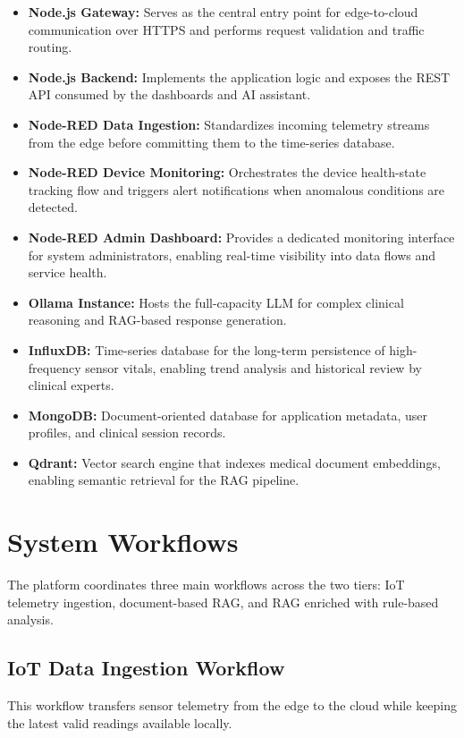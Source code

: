 \documentclass[runningheads]{llncs}
\begin{document}
\begin{itemize}
\item \textbf{Node.js Gateway:} Serves as the central entry point for edge-to-cloud communication over HTTPS and performs request validation and traffic routing.
\item \textbf{Node.js Backend:} Implements the application logic and exposes the REST API consumed by the dashboards and AI assistant.
\item \textbf{Node-RED Data Ingestion:} Standardizes incoming telemetry streams from the edge before committing them to the time-series database.
\item \textbf{Node-RED Device Monitoring:} Orchestrates the device health-state tracking flow and triggers alert notifications when anomalous conditions are detected.
\item \textbf{Node-RED Admin Dashboard:} Provides a dedicated monitoring interface for system administrators, enabling real-time visibility into data flows and service health.
\item \textbf{Ollama Instance:} Hosts the full-capacity LLM for complex clinical reasoning and RAG-based response generation.
\item \textbf{InfluxDB:} Time-series database for the long-term persistence of high-frequency sensor vitals, enabling trend analysis and historical review by clinical experts.
\item \textbf{MongoDB:} Document-oriented database for application metadata, user profiles, and clinical session records.
\item \textbf{Qdrant:} Vector search engine that indexes medical document embeddings, enabling semantic retrieval for the RAG pipeline.
\end{itemize}


\section{System Workflows}
The platform coordinates three main workflows across the two tiers: IoT telemetry ingestion, document-based RAG, and RAG enriched with rule-based analysis.

\subsection{IoT Data Ingestion Workflow}
This workflow transfers sensor telemetry from the edge to the cloud while keeping the latest valid readings available locally.
\end{document}
